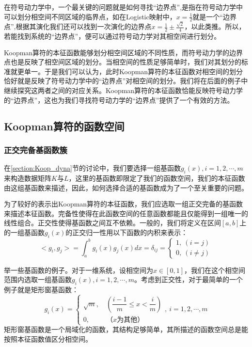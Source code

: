 在符号动力学中，一个最关键的问题就是如何寻找“边界点”,是指在符号动力学中可以划分相空间不同区域的临界点，如在Logistic映射中，$x=\frac{1}{2}$就是一个“边界点”,根据其演化我们还可以找到一次演化的边界点$x=\frac{1}{2}\pm\frac{\sqrt{2}}{4}$，以此类推。所以，若能找到系统的“边界点”，便可以通过符号动力学对其相空间进行划分。

Koopman算符的本征函数能够划分相空间区域的不同性质，而符号动力学的边界点也是反映了相空间区域的划分。当相空间的性质足够简单时，我们对其划分的标准就更单一。于是我们可以认为，此时Koopman算符的本征函数对相空间的划分恰好就是反映了符号动力学中的“边界点”对相空间的划分。我们将在后面的例子中继续探究这两者之间的对应关系。Koopman算符的本征函数恰能反映符号动力学的“边界点”，这也为我们寻找符号动力学的“边界点”提供了一个有效的方法。

\subsection{Koopman算符的函数空间}
\subsubsection{正交完备基函数簇}
在\ref{section:Koop_dyna}节的讨论中，我们要选择一组基函数${g_i(x)},i=1,2,\cdots,m$来构造数据矩阵$K$与$L$，这里的基函数即限定了我们的函数空间，我们的本征函数由这组基函数来描述，因此，如何选择合适的基函数成为了一个至关重要的问题。

为了较好的表示出Koopman算符的本征函数，我们应选取一组正交完备的基函数来描述本征函数。完备性使得在此函数空间的任意函数都能且仅能得到一组唯一的线性组合。正交性使得基函数之间互不依赖。一般的，我们将定义在区间$[a,b]$上的一组基函数${g_i(x)}$的正交归一性用以下函数的内积来表示：
\begin{equation}
    <g_i,g_j>=\int_a^b{g_i(x)g_j(x)}dx=\delta_{ij}=
    \begin{cases}
        1,\ (i=j)\\
        0,\ (i\neq j)
    \end{cases}
\end{equation}

举一些基函数的例子。对于一维系统，设相空间为$x\in [0,1]$，我们在这个相空间范围内选取一组基函数${g_i(x)},i=1,2,\cdots,m$。考虑到正交性，对于最简单的一个例子就是矩形窗基函数：
\begin{equation}
    g_i(x)=
    \begin{cases}
        \sqrt{m},\ &(\dfrac{i-1}{m}\leqslant x<\dfrac{i}{m})\\
        0,\ &（x为其他）
    \end{cases},\ i=1,2,\cdots,m
\end{equation}
矩形窗基函数是一个局域化的函数，其结构足够简单，其所描述的函数空间总是能按照本征函数值区分相空间。

